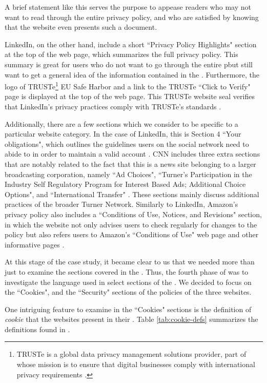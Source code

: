 \documentclass{acm_proc_article-sp}
\begin{document}
A brief statement like this serves the purpose to appease readers who may not want to read through the entire privacy policy, and who are satisfied by knowing that the website even presents such a document.

LinkedIn, on the other hand, include a short ``Privacy Policy Highlights" section at the top of the web page, which summarizes the full privacy policy. This summary is great for users who do not want to go through the entire p\pp but still want to get a general idea of the information contained in the \pp. Furthermore, the logo of TRUSTe\footnote{TRUSTe is a global data privacy management solutions provider, part of whose mission is to ensure that digital businesses comply with international privacy requirements \cite{truste}.} EU Safe Harbor and a link to the TRUSTe ``Click to Verify" page is displayed at the top of the \pp web page. This TRUSTe website seal verifies that LinkedIn's privacy practices comply with TRUSTe's standards \cite{truste}.

Additionally, there are a few sections which we consider to be specific to a particular website category. In the case of LinkedIn, this is Section 4 ``Your obligations", which outlines the guidelines users on the social network need to abide to in order to maintain a valid account \cite{linkedin}. CNN includes three extra sections that are notably related to the fact that this is a news site belonging to a larger broadcasting corporation, namely ``Ad Choices", ``Turner's Participation in the Industry Self Regulatory Program for Interest Based Ads; Additional Choice Options", and ``International Transfer" \cite{cnn}. These sections mainly discuss additional practices of the broader Turner Network. Similarly to LinkedIn, Amazon's privacy policy also includes a ``Conditions of Use, Notices, and Revisions" section, in which the website not only advises users to check regularly for changes to the policy but also refers users to Amazon's ``Conditions of Use" web page and other informative pages \cite{amazon}.

At this stage of the case study, it became clear to us that we needed more than just to examine the sections covered in the \pps. Thus, the fourth phase of was to investigate the language used in select sections of the \pps. We decided to focus on the ``Cookies", and the ``Security" sections of the policies of the three websites.

One intriguing feature to examine in the ``Cookies" sections is the definition of \textit{cookie} that the websites present in their \pps. Table \ref{tab:cookie-defs} summarizes the definitions found in \cite{amazon,linkedin,cnn}.
\end{document}
